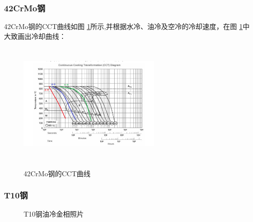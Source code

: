 \documentclass[12pt]{ctexart}
\begin{document}
\subsubsection{42CrMo钢}
42CrMo钢的CCT曲线如图 \ref{cct42}所示,并根据水冷、油冷及空冷的冷却速度，在图 \ref{cct42}中大致画出冷却曲线：
\begin{figure}[h]
  \centering
  \includegraphics[width=7cm,height=6cm]{cct42.jpg}\\
  \caption{42CrMo钢的CCT曲线}\label{cct42}
\end{figure}

\subsubsection{T10钢}
\begin{figure}[h]
  \centering
  \caption{T10钢油冷金相照片}
  \label{10water}
\end{figure}
\end{document}

